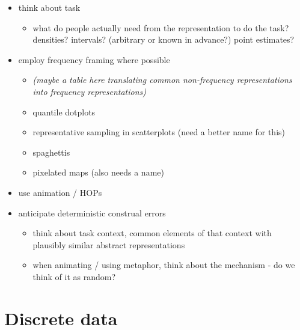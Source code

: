\documentclass[]{book}
\providecommand{\tightlist}{%
  \setlength{\itemsep}{0pt}\setlength{\parskip}{0pt}}
\theoremstyle{definition}
\theoremstyle{definition}
\theoremstyle{definition}
\theoremstyle{remark}
\begin{document}
\begin{itemize}
\tightlist
\item
  think about task

  \begin{itemize}
  \tightlist
  \item
    what do people actually need from the representation to do the task?
    densities? intervals? (arbitrary or known in advance?) point
    estimates?
  \end{itemize}
\item
  employ frequency framing where possible

  \begin{itemize}
  \tightlist
  \item
    \emph{(maybe a table here translating common non-frequency
    representations into frequency representations)}
  \item
    quantile dotplots
  \item
    representative sampling in scatterplots (need a better name for
    this)
  \item
    spaghettis
  \item
    pixelated maps (also needs a name)
  \end{itemize}
\item
  use animation / HOPs
\item
  anticipate deterministic construal errors

  \begin{itemize}
  \tightlist
  \item
    think about task context, common elements of that context with
    plausibly similar abstract representations
  \item
    when animating / using metaphor, think about the mechanism - do we
    think of it as random?
  \end{itemize}
\end{itemize}

\hypertarget{ch-discrete}{%
\chapter{Discrete data}\label{ch-discrete}}
\end{document}
